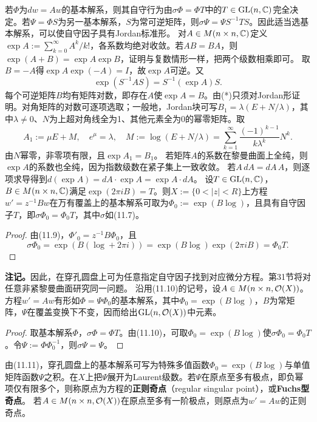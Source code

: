 若$\Phi$为$dw=Aw$的基本解系，则其自守行为由$\sigma\Phi=\Phi T$中的$T\in\operatorname{GL}(n,\mathbb C)$完全决定。若$\Psi=\Phi S$为另一基本解系，$S$为常可逆矩阵，则$\sigma\Psi=\Psi S^{-1}TS$。因此适当选基本解系，可以使自守因子具有Jordan标准形。
对$A\in M(n\times n,\mathbb C)$定义$\exp A:=\sum_{k=0}^\infty A^k/k!$，各系数均绝对收敛。若$AB=BA$，则$\exp(A+B)=\exp A\exp B$，证明与复数情形一样，把两个级数相乘即可。
取$B=-A$得$\exp A\exp(-A)=I$，故$\exp A$可逆。又
\begin{equation}\exp(S^{-1}AS)=S^{-1}(\exp A)S.\tag{*}\end{equation}
每个可逆矩阵$B$均有矩阵对数，即存在$A$使$\exp A=B$。由(*)只须对Jordan形证明。对角矩阵的对数可逐项选取；一般地，Jordan块可写$B_1=\lambda(E+N/\lambda)$，其中$\lambda\ne0$、$N$为上超对角线全为1、其他元素全为0的幂零矩阵。取
\[
A_1:=\mu E+M,\quad e^\mu=\lambda,\quad
M:=\log(E+N/\lambda)=\sum_{k=1}^\infty\frac{(-1)^{k-1}}{k\lambda^k}N^k.
\]
由$N$幂零，非零项有限，且$\exp A_1=B_1$。
若矩阵$A$的系数在黎曼曲面上全纯，则$\exp A$的系数也全纯，因为指数级数在紧子集上一致收敛。
若$A\,dA=dA\,A$，则逐项求导得到$d(\exp A)=dA\cdot\exp A=\exp A\cdot dA$。
设$T\in\operatorname{GL}(n,\mathbb C)$，$B\in M(n\times n,\mathbb C)$满足$\exp(2\pi iB)=T$。则$X:=\{0<|z|<R\}$上方程$w'=z^{-1}Bw$在万有覆盖上的基本解系可取为$\Phi_0:=\exp(B\log)$，且具有自守因子$T$，即$\sigma\Phi_0=\Phi_0T$，其中$\sigma$如(11.7)。
\begin{proof}
由(11.9)，$\Phi'_0=z^{-1}B\Phi_0$，且
\[
\sigma\Phi_0=\exp(B(\log+2\pi i))=\exp(B\log)\exp(2\pi iB)=\Phi_0T.
\]
\end{proof}
\textbf{注记。}因此，在穿孔圆盘上可为任意指定自守因子找到对应微分方程。第31节将对任意非紧黎曼曲面研究同一问题。
沿用(11.10)的记号，设$A\in M(n\times n,\mathcal O(X))$。方程$w'=Aw$有形如$\Phi=\Psi\Phi_0$的基本解系，其中$\Phi_0=\exp(B\log)$，$B$为常矩阵，$\Psi$在覆盖变换下不变，因而给出$\operatorname{GL}(n,\mathcal O(X))$中元素。
\begin{proof}
取基本解系$\Phi$，$\sigma\Phi=\Phi T$。由(11.10)，可取$\Phi_0=\exp(B\log)$使$\sigma\Phi_0=\Phi_0T$。令$\Psi:=\Phi\Phi_0^{-1}$，则$\sigma\Psi=\Psi$。
\end{proof}
由(11.11)，穿孔圆盘上的基本解系可写为特殊多值函数$\Phi_0=\exp(B\log)$与单值矩阵函数$\Psi$之积。在$X$上把$\Psi$展开为Laurent级数。若$\Psi$在原点至多有极点，即负幂项仅有限多个，则称原点为方程的\textbf{正则奇点}（regular singular point），或\textbf{Fuchs型奇点}。
若$A\in M(n\times n,\mathcal O(X))$在原点至多有一阶极点，则原点为$w'=Aw$的正则奇点。

